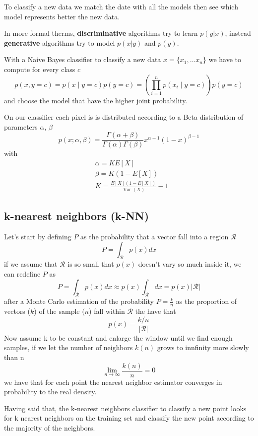 \documentclass[12pt]{article}
\begin{document}
To classify a new data we match the date with all the models then see which model 
represents better the new data.

In more formal therms, \textbf{discriminative} algorithms try to learn $p(y|x)$, 
instead \textbf{generative} algorithms try to model $p(x|y)$ and $p(y)$.

With a Naive Bayes classifier to classify a new data $x = \{x_1,\dots x_n\}$ we have 
to compute for every class $c$
$$
p(x, y=c)=p(x \mid y=c) p(y=c)=\left(\prod_{i=1}^{n} p\left(x_i \mid y=c\right)\right) p(y=c)
$$
and choose the model that have the higher joint probability.

On our classifier each pixel is is distributed according to a Beta distribution of 
parameters $\alpha$, $\beta$
$$
p(x ; \alpha, \beta)=\frac{\Gamma(\alpha+\beta)}{\Gamma(\alpha) \Gamma(\beta)} x^{\alpha-1}(1-x)^{\beta-1}
$$
with
$$
\begin{aligned}
& \alpha=K E[X] \\
& \beta=K(1-E[X]) \\
& K=\frac{E[X](1-E[X])}{\operatorname{Var}(X)}-1
\end{aligned}
$$

\subsection{k-nearest neighbors (k-NN)}

Let's start by defining $P$ as the probability that a vector fall into a region $\mathcal{R}$
$$
    P=\int_{\mathcal{R}} p(x) d x
$$
if we assume that $\mathcal{R}$ is so small that $p(x)$ doesn't vary so much inside it,
we can redefine $P$ as
$$
    P=\int_{\mathcal{R}} p(x) d x \approx p(x) \int_{\mathcal{R}} d x=p(x)|\mathcal{R}|
$$
after a Monte Carlo estimation of the probability $P = \frac{k}{n}$ as the proportion
of vectors ($k$) of the sample ($n$) fall within $\mathcal{R}$ the have that
$$
    p(x) = \frac{k/n}{|\mathcal{R}|}
$$
Now assume k to be constant and enlarge the window until we find enough samples, if
we let the number of neighbors $k(n)$  grows to innfinity more slowly than n
$$
    \lim _{n \rightarrow \infty} \frac{k(n)}{n}=0
$$
we have that for each point the nearest neighbor estimator converges in
probability to the real density.

Having said that, the k-nearest neighbors classifier to classify a new point looks for
k nearest neighbors on the training set and classify the new point according to the 
majority of the neighbors.
\end{document}
